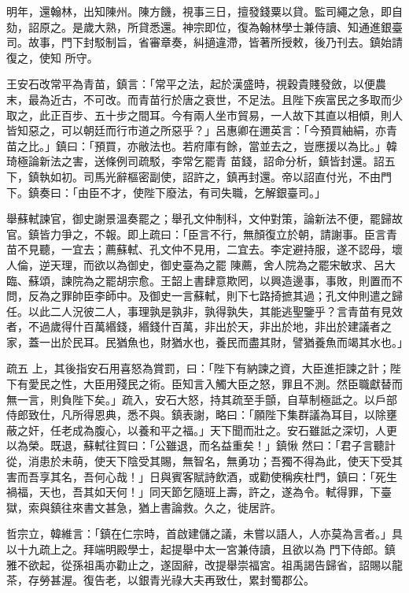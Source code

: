 \begin{pinyinscope}
 明年，還翰林，出知陳州。陳方饑，視事三日，擅發錢粟以貸。監司繩之急，即自劾，詔原之。是歲大熟，所貸悉還。神宗即位，復為翰林學士兼侍讀、知通進銀臺司。故事，門下封駁制旨，省審章奏，糾擿違滯，皆著所授敕，後乃刊去。鎮始請復之，使知
 所守。



 王安石改常平為青苗，鎮言：「常平之法，起於漢盛時，視穀貴賤發斂，以便農末，最為近古，不可改。而青苗行於唐之衰世，不足法。且陛下疾富民之多取而少取之，此正百步、五十步之間耳。今有兩人坐市貿易，一人故下其直以相傾，則人皆知惡之，可以朝廷而行市道之所惡乎？」呂惠卿在邇英言：「今預買紬絹，亦青苗之比。」鎮曰：「預買，亦敝法也。若府庫有餘，當並去之，豈應援以為比。」韓琦極論新法之害，送條例司疏駁，李常乞罷青
 苗錢，詔命分析，鎮皆封還。詔五下，鎮執如初。司馬光辭樞密副使，詔許之，鎮再封還。帝以詔直付光，不由門下。鎮奏曰：「由臣不才，使陛下廢法，有司失職，乞解銀臺司。」



 舉蘇軾諫官，御史謝景溫奏罷之；舉孔文仲制科，文仲對策，論新法不便，罷歸故官。鎮皆力爭之，不報。即上疏曰：「臣言不行，無顏復立於朝，請謝事。臣言青苗不見聽，一宜去；薦蘇軾、孔文仲不見用，二宜去。李定避持服，遂不認母，壞人倫，逆天理，而欲以為御史，御史臺為之罷
 陳薦，舍人院為之罷宋敏求、呂大臨、蘇頌，諫院為之罷胡宗愈。王韶上書肆意欺罔，以興造邊事，事敗，則置而不問，反為之罪帥臣李師中。及御史一言蘇軾，則下七路掎摭其過；孔文仲則遣之歸任。以此二人況彼二人，事理孰是孰非，孰得孰失，其能逃聖鑒乎？言青苗有見效者，不過歲得什百萬緡錢，緡錢什百萬，非出於天，非出於地，非出於建議者之家，蓋一出於民耳。民猶魚也，財猶水也，養民而盡其財，譬猶養魚而竭其水也。」



 疏五
 上，其後指安石用喜怒為賞罰，曰：「陛下有納諫之資，大臣進拒諫之計；陛下有愛民之性，大臣用殘民之術。臣知言入觸大臣之怒，罪且不測。然臣職獻替而無一言，則負陛下矣。」疏入，安石大怒，持其疏至手顫，自草制極詆之。以戶部侍郎致仕，凡所得恩典，悉不與。鎮表謝，略曰：「願陛下集群議為耳目，以除壅蔽之奸，任老成為腹心，以養和平之福。」天下聞而壯之。安石雖詆之深切，人更以為榮。既退，蘇軾往賀曰：「公雖退，而名益重矣！」鎮愀
 然曰：「君子言聽計從，消患於未萌，使天下陰受其賜，無智名，無勇功；吾獨不得為此，使天下受其害而吾享其名，吾何心哉！」日與賓客賦詩飲酒，或勸使稱疾杜門，鎮曰：「死生禍福，天也，吾其如天何！」同天節乞隨班上壽，許之，遂為令。軾得罪，下臺獄，索與鎮往來書文甚急，猶上書論救。久之，徙居許。



 哲宗立，韓維言：「鎮在仁宗時，首啟建儲之議，未嘗以語人，人亦莫為言者。」具以十九疏上之。拜端明殿學士，起提舉中太一宮兼侍讀，且欲以為
 門下侍郎。鎮雅不欲起，從孫祖禹亦勸止之，遂固辭，改提舉崇福宮。祖禹謁告歸省，詔賜以龍茶，存勞甚渥。復告老，以銀青光祿大夫再致仕，累封蜀郡公。




\end{pinyinscope}
